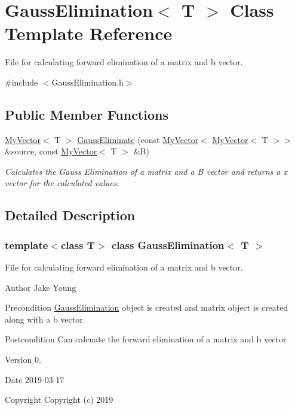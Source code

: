 \hypertarget{class_gauss_elimination}{}\section{Gauss\+Elimination$<$ T $>$ Class Template Reference}
\label{class_gauss_elimination}


File for calculating forward elimination of a matrix and b vector.  




{\ttfamily \#include $<$Gauss\+Elimination.\+h$>$}

\subsection*{Public Member Functions}
\begin{DoxyCompactItemize}
\item 
\mbox{\hyperlink{class_my_vector}{My\+Vector}}$<$ T $>$ \mbox{\hyperlink{class_gauss_elimination_af4df02b15566a600f527788332deaefa}{Gauss\+Eliminate}} (const \mbox{\hyperlink{class_my_vector}{My\+Vector}}$<$ \mbox{\hyperlink{class_my_vector}{My\+Vector}}$<$ T $>$$>$ \&source, const \mbox{\hyperlink{class_my_vector}{My\+Vector}}$<$ T $>$ \&B)
\begin{DoxyCompactList}\small\item\em Calculates the Gauss Elimination of a matrix and a B vector and returns a x vector for the calculated values. \end{DoxyCompactList}\end{DoxyCompactItemize}


\subsection{Detailed Description}
\subsubsection*{template$<$class T$>$\newline
class Gauss\+Elimination$<$ T $>$}

File for calculating forward elimination of a matrix and b vector. 

\begin{DoxyAuthor}{Author}
Jake Young 
\end{DoxyAuthor}
\begin{DoxyPrecond}{Precondition}
\mbox{\hyperlink{class_gauss_elimination}{Gauss\+Elimination}} object is created and matrix object is created along with a b vector 
\end{DoxyPrecond}
\begin{DoxyPostcond}{Postcondition}
Can calcuate the forward elimination of a matrix and b vector 
\end{DoxyPostcond}
\begin{DoxyVersion}{Version}
0. 
\end{DoxyVersion}
\begin{DoxyDate}{Date}
2019-\/03-\/17
\end{DoxyDate}
\begin{DoxyCopyright}{Copyright}
Copyright (c) 2019 
\end{DoxyCopyright}


